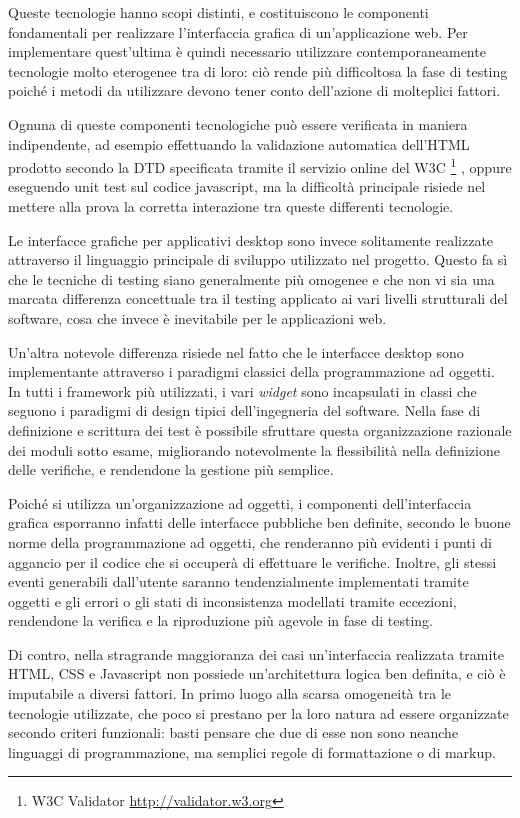 Queste tecnologie hanno scopi distinti, e costituiscono le componenti fondamentali per realizzare l'interfaccia grafica di un'applicazione web. Per implementare quest'ultima è quindi necessario utilizzare contemporaneamente tecnologie molto eterogenee tra di loro: ciò rende più difficoltosa la fase di testing poiché i metodi da utilizzare devono tener conto dell'azione di molteplici fattori. 

Ognuna di queste componenti tecnologiche può essere verificata in maniera indipendente, ad esempio effettuando la validazione automatica dell'HTML prodotto secondo la DTD specificata tramite il servizio online del W3C \footnote{W3C Validator \url{http://validator.w3.org}} , oppure eseguendo unit test sul codice javascript, ma la difficoltà principale risiede nel mettere alla prova la corretta interazione tra queste differenti tecnologie. 

Le interfacce grafiche per applicativi desktop sono invece solitamente realizzate attraverso il linguaggio principale di sviluppo utilizzato nel progetto. Questo fa sì che le tecniche di testing siano generalmente più omogenee e che non vi sia una marcata differenza concettuale tra il testing applicato ai vari livelli strutturali del software, cosa che invece è inevitabile per le applicazioni web.

Un'altra notevole differenza risiede nel fatto che le interfacce desktop sono implementante attraverso i paradigmi classici della programmazione ad oggetti. In tutti i framework più utilizzati, i vari \emph{widget} sono incapsulati in classi che seguono i paradigmi di design tipici dell'ingegneria del software. Nella fase di definizione e scrittura dei test è possibile sfruttare questa organizzazione razionale dei moduli sotto esame, migliorando notevolmente la flessibilità nella definizione delle verifiche, e rendendone la gestione più semplice. 

Poiché si utilizza un'organizzazione ad oggetti, i componenti dell'interfaccia grafica esporranno infatti delle interfacce pubbliche ben definite, secondo le buone norme della programmazione ad oggetti, che renderanno più evidenti i punti di aggancio per il codice che si occuperà di effettuare le verifiche. Inoltre, gli stessi eventi generabili dall'utente saranno tendenzialmente implementati tramite oggetti e gli errori o gli stati di inconsistenza modellati tramite eccezioni, rendendone la verifica e la riproduzione più agevole in fase di testing.

Di contro, nella stragrande maggioranza dei casi un'interfaccia realizzata tramite HTML, CSS e Javascript non possiede un'architettura logica ben definita, e ciò è imputabile a diversi fattori. 
In primo luogo alla scarsa omogeneità tra le tecnologie utilizzate, che poco si prestano per la loro natura ad essere organizzate secondo criteri funzionali: basti pensare che due di esse non sono neanche linguaggi di programmazione, ma semplici regole di formattazione o di markup. 

